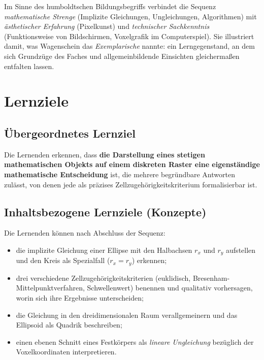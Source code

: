 \documentclass[12pt,a4paper]{scrartcl}
\newcommand{\acc}[1]{\textcolor{accent}{\textbf{#1}}}
\begin{document}
\begin{hinweis}
Im Sinne des humboldtschen Bildungsbegriffs verbindet die Sequenz \emph{mathematische Strenge} (Implizite Gleichungen, Ungleichungen, Algorithmen) mit \emph{ästhetischer Erfahrung} (Pixelkunst) und \emph{technischer Sachkenntnis} (Funktionsweise von Bildschirmen, Voxelgrafik im Computerspiel). Sie illustriert damit, was Wagenschein das \emph{Exemplarische} nannte: ein Lerngegenstand, an dem sich Grundzüge des Faches und allgemeinbildende Einsichten gleichermaßen entfalten lassen.
\end{hinweis}

\section{Lernziele}

\subsection{Übergeordnetes Lernziel}

Die Lernenden erkennen, dass \acc{die Darstellung eines stetigen mathematischen Objekts auf einem diskreten Raster eine eigenständige mathematische Entscheidung} ist, die mehrere begründbare Antworten zulässt, von denen jede als präzises Zellzugehörigkeitskriterium formalisierbar ist.

\subsection{Inhaltsbezogene Lernziele (Konzepte)}

Die Lernenden können nach Abschluss der Sequenz:

\begin{itemize}[leftmargin=1.3em,itemsep=0.15em,topsep=0.3em]
  \item die implizite Gleichung einer Ellipse mit den Halbachsen $r_x$ und $r_y$ aufstellen und den Kreis als Spezialfall ($r_x = r_y$) erkennen;
  \item drei verschiedene Zellzugehörigkeitskriterien (euklidisch, Bresenham-Mittelpunktverfahren, Schwellenwert) benennen und qualitativ vorhersagen, worin sich ihre Ergebnisse unterscheiden;
  \item die Gleichung in den dreidimensionalen Raum verallgemeinern und das Ellipsoid als Quadrik beschreiben;
  \item einen ebenen Schnitt eines Festkörpers als \emph{lineare Ungleichung} bezüglich der Voxelkoordinaten interpretieren.
\end{itemize}
\end{document}
